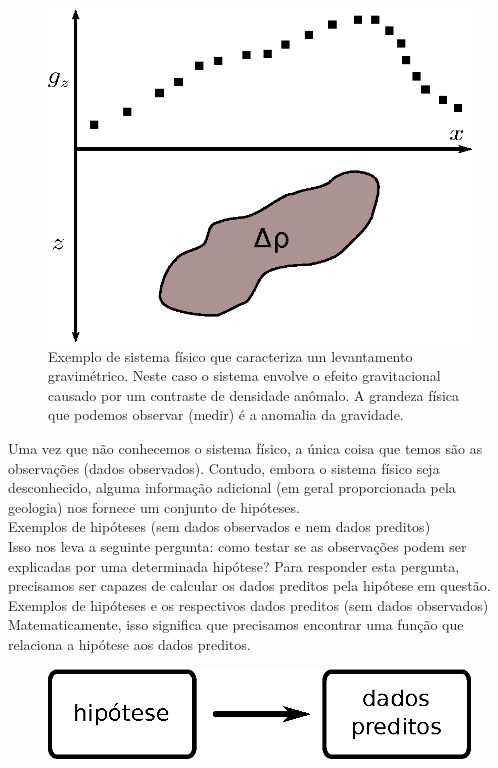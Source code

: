 \begin{figure}
    \centering
    \includegraphics[scale=1]{../figs/system-grav.eps}
    \caption{Exemplo de sistema físico que caracteriza um levantamento
        gravimétrico. Neste caso o sistema envolve o efeito gravitacional
        causado por um contraste de densidade anômalo. A grandeza física que
        podemos observar (medir) é a anomalia da gravidade.}
    \label{system-grav}
\end{figure}

\indent Uma vez que não conhecemos o sistema físico, a única coisa que temos são as
observações (dados observados). Contudo, embora o sistema físico seja
desconhecido, alguma informação adicional (em geral proporcionada pela geologia)
nos fornece um conjunto de hipóteses.
\\
Exemplos de hipóteses (sem dados observados e nem dados preditos)
\\
\indent Isso nos leva a seguinte pergunta: como testar se as observações podem ser
explicadas por uma determinada hipótese? Para responder esta pergunta,
precisamos ser capazes de calcular os dados preditos pela hipótese em questão.
\\
Exemplos de hipóteses e os respectivos dados preditos (sem dados observados)
\\
\indent Matematicamente, isso significa que precisamos encontrar uma função que
relaciona a hipótese aos dados preditos.

\begin{figure}[!htb]
  \centering
    \includegraphics[scale=1]{../figs/hipotese-preditos.eps}
  \label{hipotese-preditos}
\end{figure}


